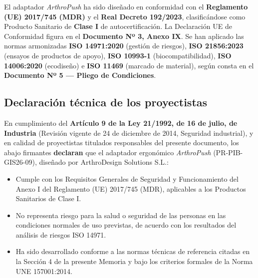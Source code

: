 \documentclass[11pt,a4paper]{article}
\begin{document}
El adaptador \textit{ArthroPush} ha sido diseñado en conformidad con el \textbf{Reglamento (UE) 2017/745 (MDR)} y el \textbf{Real Decreto 192/2023}, clasificándose como Producto Sanitario de \textbf{Clase I} de autocertificación. La Declaración UE de Conformidad figura en el \textbf{Documento Nº 3, Anexo IX}. Se han aplicado las normas armonizadas \textbf{ISO 14971:2020} (gestión de riesgos), \textbf{ISO 21856:2023} (ensayos de productos de apoyo), \textbf{ISO 10993-1} (biocompatibilidad), \textbf{ISO 14006:2020} (ecodiseño) e \textbf{ISO 11469} (marcado de material), según consta en el \textbf{Documento Nº 5 — Pliego de Condiciones}.

\newpage
\subsection{Declaración técnica de los proyectistas}

En cumplimiento del \textbf{Artículo 9 de la Ley 21/1992, de 16 de julio, de Industria} (Revisión vigente de 24 de diciembre de 2014, Seguridad industrial), y en calidad de proyectistas titulados responsables del presente documento, los abajo firmantes \textbf{declaran} que el adaptador ergonómico \textit{ArthroPush} (PR-PIB-GIS26-09), diseñado por ArthroDesign Solutions S.L.:

\begin{itemize}
    \item Cumple con los Requisitos Generales de Seguridad y Funcionamiento del Anexo I del Reglamento (UE) 2017/745 (MDR), aplicables a los Productos Sanitarios de Clase I.
    \item No representa riesgo para la salud o seguridad de las personas en las condiciones normales de uso previstas, de acuerdo con los resultados del análisis de riesgos ISO 14971.
    \item Ha sido desarrollado conforme a las normas técnicas de referencia citadas en la Sección 4 de la presente Memoria y bajo los criterios formales de la Norma UNE 157001:2014.
\end{itemize}

\vspace{1.5cm}
\end{document}
